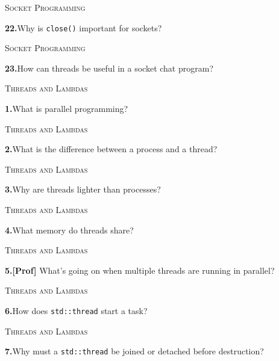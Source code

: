 \documentclass[11pt,a4paper]{article}
\newenvironment{questionblock}{%
  \begin{minipage}[t][0.455\textheight][t]{\textwidth}%
  \raggedright\small
}{%
  \vfill
  \end{minipage}%
}
\newcommand{\sectionlabel}[1]{\textsc{#1}\par\vspace{0.35em}}
\newcommand{\questionnumber}[1]{\textbf{#1.}\enspace}
\begin{document}
\newpage
\begin{questionblock}
\sectionlabel{Socket Programming}
\questionnumber{22}Why is \verb|close()| important for sockets?\par
\end{questionblock}
\vspace*{0.04\textheight}
\begin{questionblock}
\sectionlabel{Socket Programming}
\questionnumber{23}How can threads be useful in a socket chat program?\par

\end{questionblock}
\newpage
\begin{questionblock}
\sectionlabel{Threads and Lambdas}
\questionnumber{1}What is parallel programming?\par
\end{questionblock}
\vspace*{0.04\textheight}
\begin{questionblock}
\sectionlabel{Threads and Lambdas}
\questionnumber{2}What is the difference between a process and a thread?\par
\end{questionblock}
\newpage
\begin{questionblock}
\sectionlabel{Threads and Lambdas}
\questionnumber{3}Why are threads lighter than processes?\par
\end{questionblock}
\vspace*{0.04\textheight}
\begin{questionblock}
\sectionlabel{Threads and Lambdas}
\questionnumber{4}What memory do threads share?\par
\end{questionblock}
\newpage
\begin{questionblock}
\sectionlabel{Threads and Lambdas}
\questionnumber{5}\textbf{[Prof]} What's going on when multiple threads are running in parallel?\par
\end{questionblock}
\vspace*{0.04\textheight}
\begin{questionblock}
\sectionlabel{Threads and Lambdas}
\questionnumber{6}How does \verb|std::thread| start a task?\par
\end{questionblock}
\newpage
\begin{questionblock}
\sectionlabel{Threads and Lambdas}
\questionnumber{7}Why must a \verb|std::thread| be joined or detached before destruction?\par
\end{questionblock}
\end{document}

